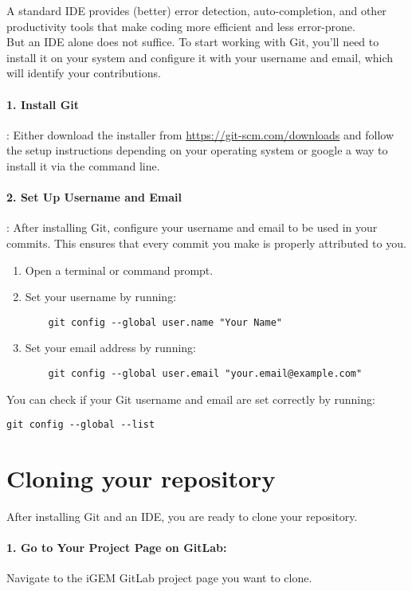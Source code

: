A standard IDE provides (better) error detection, auto-completion, and other productivity tools that make coding more efficient and less error-prone. \\ \newline
But an IDE alone does not suffice.
To start working with Git, you'll need to install it on your system and configure it with your username and email, which will identify your contributions.

\paragraph{1. Install Git}: Either download the installer from
\href{https://git-scm.com}{https://git-scm.com/downloads} and follow the setup instructions depending on your operating system or google a way to install it via the command line.

\paragraph{2. Set Up Username and Email}: After installing Git, configure your username and email to be used in your
commits.
This ensures that every commit you make is properly attributed to you.
\begin{enumerate}
    \item Open a terminal or command prompt.
    \item Set your username by running:
    \begin{verbatim}
    git config --global user.name "Your Name"
    \end{verbatim}
    \item Set your email address by running:
    \begin{verbatim}
    git config --global user.email "your.email@example.com"
    \end{verbatim}
\end{enumerate}
You can check if your Git username and email are set correctly by running:
\begin{verbatim}
git config --global --list
\end{verbatim}

\section{Cloning your repository} \label{sec:cloning} 
After installing Git and an IDE, you are ready to clone your repository.
\paragraph{1. Go to Your Project Page on GitLab:}
Navigate to the iGEM GitLab project page you want to clone.  

